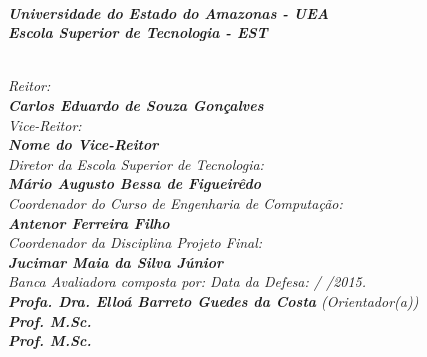 \begin{spacing}{1.4}
\textit{\textbf{\\
Universidade do Estado do Amazonas - UEA\\
Escola Superior de Tecnologia - EST}}

\textit{\\
Reitor:\\ 
\textbf{
Carlos Eduardo de Souza Gonçalves}\\
Vice-Reitor:\\ \textbf{Nome do Vice-Reitor}}
\\
\textit{
Diretor da Escola Superior de Tecnologia:\\ 
\textbf{Mário Augusto Bessa de Figueirêdo}}
\\
\textit{
Coordenador do Curso de Engenharia de Computação:\\
\textbf{Antenor Ferreira Filho}}
\\
\textit{
Coordenador da Disciplina Projeto Final:\\
\textbf{Jucimar Maia da Silva Júnior}}
\\[12pt]
\textit{
Banca Avaliadora composta por: \hfill Data da Defesa:  /  /2015.\\
}
\textit{ 
\textbf{Profa. Dra. Elloá Barreto Guedes da Costa} (Orientador(a))\\
\textbf{Prof. M.Sc. }\\%
\textbf{Prof. M.Sc. }
}
\ \ \\
 \begin{small}
\begin{center}
\end{center}
\end{small}
\end{spacing}
 \newpage
